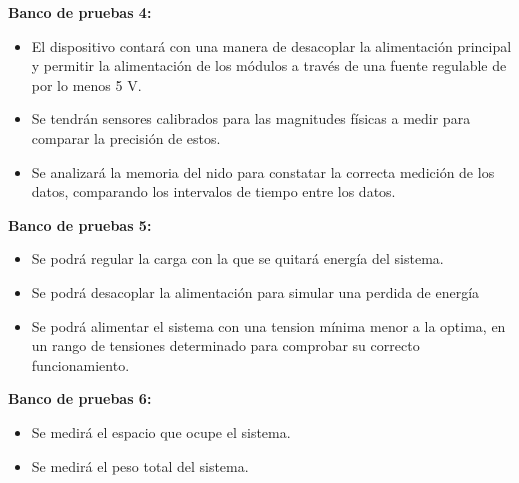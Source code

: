 \textbf{Banco de pruebas 4:}
\begin{itemize}
	\item El dispositivo contará con una manera de desacoplar la alimentación principal y permitir la alimentación de los módulos a través de una fuente regulable de por lo menos 5 V.%
	\item Se tendrán sensores calibrados para las magnitudes físicas a medir para comparar la precisión de estos.
	\item Se analizará la memoria del nido para constatar la correcta medición de los datos, comparando los intervalos de tiempo entre los datos.
\end{itemize}

\textbf{Banco de pruebas 5:}
\begin{itemize}
	\item Se podrá regular la carga con la que se quitará energía del sistema.
	\item Se podrá desacoplar la alimentación para simular una perdida de energía
	\item Se podrá alimentar el sistema con una tension mínima menor a la optima, en un rango de tensiones determinado para comprobar su correcto funcionamiento.
\end{itemize}

\textbf{Banco de pruebas 6:}
\begin{itemize}
	\item Se medirá el espacio que ocupe el sistema.
	\item Se medirá el peso total del sistema.
\end{itemize}